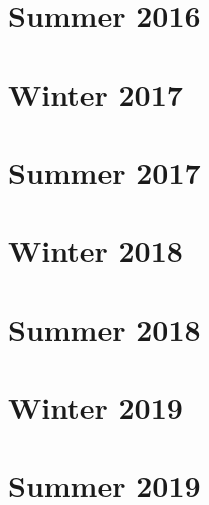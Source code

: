 \documentclass[12pt]{article}
\begin{document}
\section{Summer 2016}\label{sec:s16}

\newpage
\section{Winter 2017}\label{sec:w17}

\newpage
\section{Summer 2017}\label{sec:s17}

\newpage
\section{Winter 2018}\label{sec:w18}

\newpage
\section{Summer 2018}\label{sec:s18}

\newpage
\section{Winter 2019}\label{sec:w19}

\newpage
\section{Summer 2019}\label{sec:s19}

\end{document}
